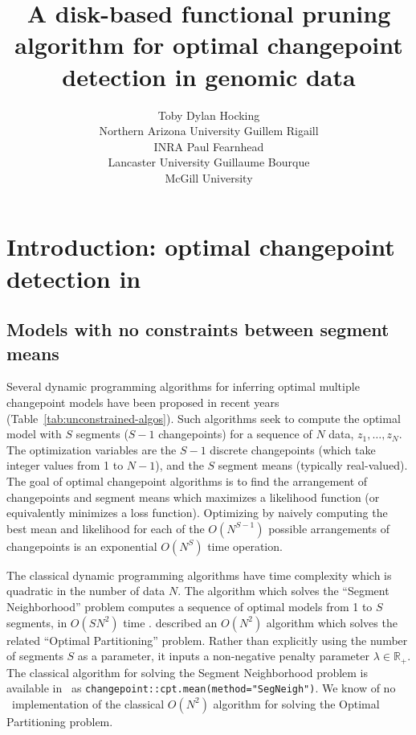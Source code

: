 \documentclass[article]{jss}
\author{Toby Dylan Hocking\\Northern Arizona University
   \And Guillem Rigaill\\INRA
   \And Paul Fearnhead\\Lancaster University
   \And Guillaume Bourque\\McGill University}
\title{A disk-based functional pruning algorithm for optimal changepoint
  detection in genomic data}
\newcommand{\R}{\proglang{R}}
\newcommand{\RR}{\mathbb R}
\begin{document}


\section[Introduction: optimal changepoint detection in R]{Introduction: optimal changepoint detection in } \label{sec:intro}

\subsection{Models with no constraints between segment means}

Several dynamic programming algorithms for inferring optimal multiple
changepoint models have been proposed in recent years
(Table~\ref{tab:unconstrained-algos}). Such algorithms seek to compute
the optimal model with $S$ segments ($S-1$ changepoints) for a
sequence of $N$ data, $z_1,\dots,z_N$. The optimization variables are
the $S-1$ discrete changepoints (which take integer values from 1 to
$N-1$), and the $S$ segment means (typically real-valued). The goal of
optimal changepoint algorithms is to find the arrangement of
changepoints and segment means which maximizes a likelihood function
(or equivalently minimizes a loss function). Optimizing by naively
computing the best mean and likelihood for each of the $O(N^{S-1})$
possible arrangements of changepoints is an exponential $O(N^S)$ time
operation.

The classical dynamic programming algorithms have time complexity
which is quadratic in the number of data $N$. The algorithm which
solves the ``Segment Neighborhood'' problem computes a sequence of
optimal models from 1 to $S$ segments, in $O(SN^2)$ time
\citet{segment-neighborhood}.  \citet{optimal-partitioning} described
an $O(N^2)$ algorithm which solves the related ``Optimal
Partitioning'' problem. Rather than explicitly using the number of
segments $S$ as a parameter, it inputs a non-negative penalty
parameter $\lambda\in \RR_+$. The classical algorithm for solving the
Segment Neighborhood problem is available in \R\ as
\verb|changepoint::cpt.mean(method="SegNeigh")|. We know of no \R\
implementation of the classical $O(N^2)$ algorithm for solving the Optimal
Partitioning problem.
\end{document}
